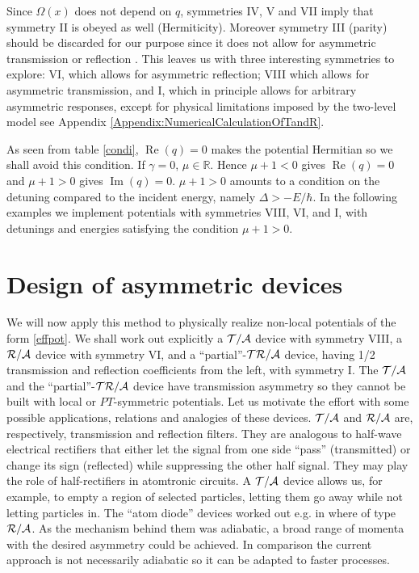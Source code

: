 Since $\Omega(x)$ does not depend on $q$, symmetries IV, V and VII imply that symmetry II is obeyed as well (Hermiticity).
Moreover symmetry III (parity) should be discarded for our purpose since it does not allow for asymmetric transmission or reflection
\cite{Ruschhaupt2017}.
This leaves us with three interesting symmetries to explore:
VI, which allows for  asymmetric reflection; VIII which allows for asymmetric transmission, and  I,
which in principle allows for arbitrary asymmetric responses, except for physical limitations imposed by
the two-level model see Appendix \ref{Appendix:NumericalCalculationOfTandR}.


%
%
As seen from  table \ref{condi}, $\operatorname{Re}(q)=0$ makes the potential Hermitian so we shall avoid this condition.
If $\gamma=0$,   $\mu \in \mathbb{R}$. Hence $\mu+1<0$ gives $\operatorname{Re}(q)=0$ and $\mu+1>0$ gives
$\operatorname{Im}(q)=0$. $\mu+1>0$ amounts to a condition on the detuning compared to the incident energy, namely $\Delta>-E/\hbar$.
In the following examples we implement potentials with symmetries VIII, VI, and I, with detunings and energies satisfying the condition $\mu+1>0$.
%
%
%

%
%
%
\section{Design of asymmetric devices\label{exa}}
%
%
We will now apply this method to physically realize non-local potentials of the form \eqref{effpot}.
%
We  shall work out  explicitly a ${\cal T/A}$ device with symmetry  VIII, a ${\cal R/A}$ device with symmetry  VI, and a ``partial''-${\cal TR/A}$ device,  having 1/2 transmission and reflection coefficients from the left, with symmetry I. The  ${\cal T/A}$ and the ``partial''-${\cal TR/A}$ device have transmission asymmetry so they cannot be built with local or $PT$-symmetric  potentials.
Let us  motivate the effort with some possible applications, relations  and analogies of these devices.
${\cal T/A}$ and ${\cal R/A}$ are, respectively, transmission and reflection filters. They are analogous to
half-wave electrical rectifiers that either let the signal from one side ``pass'' (transmitted) or change its sign (reflected)
while suppressing the other half signal.  They may play the role of half-rectifiers in atomtronic circuits.
A ${\cal T/A}$ device allows us, for example, to empty a region of selected particles, letting them go away while not letting particles in.
The ``atom diode'' devices worked out e.g. in \cite{Ruschhaupt2004,Ruschhaupt2006a,Ruschhaupt2006,Ruschhaupt2007}
where of type ${\cal R/A}$. As the mechanism behind them was adiabatic, a broad range of momenta with the desired asymmetry
could be achieved. In comparison the current approach is not necessarily adiabatic so it can be adapted to faster processes.

